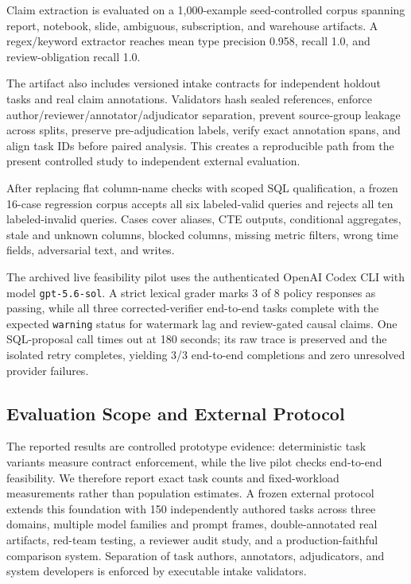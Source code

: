 \documentclass[sigconf,nonacm]{acmart}
\newcommand{\code}[1]{\texttt{#1}}
\begin{document}
Claim extraction is evaluated on a 1{,}000-example seed-controlled corpus spanning report, notebook, slide, ambiguous, subscription, and warehouse artifacts. A regex/keyword extractor reaches mean type precision 0.958, recall 1.0, and review-obligation recall 1.0.

The artifact also includes versioned intake contracts for independent holdout tasks and real claim annotations. Validators hash sealed references, enforce author/reviewer/annotator/adjudicator separation, prevent source-group leakage across splits, preserve pre-adjudication labels, verify exact annotation spans, and align task IDs before paired analysis. This creates a reproducible path from the present controlled study to independent external evaluation.

After replacing flat column-name checks with scoped SQL qualification, a frozen 16-case regression corpus accepts all six labeled-valid queries and rejects all ten labeled-invalid queries. Cases cover aliases, CTE outputs, conditional aggregates, stale and unknown columns, blocked columns, missing metric filters, wrong time fields, adversarial text, and writes.

The archived live feasibility pilot uses the authenticated OpenAI Codex CLI with model \code{gpt-5.6-sol}. A strict lexical grader marks 3 of 8 policy responses as passing, while all three corrected-verifier end-to-end tasks complete with the expected \code{warning} status for watermark lag and review-gated causal claims. One SQL-proposal call times out at 180 seconds; its raw trace is preserved and the isolated retry completes, yielding 3/3 end-to-end completions and zero unresolved provider failures.

\subsection{Evaluation Scope and External Protocol}
The reported results are controlled prototype evidence: deterministic task variants measure contract enforcement, while the live pilot checks end-to-end feasibility. We therefore report exact task counts and fixed-workload measurements rather than population estimates. A frozen external protocol extends this foundation with 150 independently authored tasks across three domains, multiple model families and prompt frames, double-annotated real artifacts, red-team testing, a reviewer audit study, and a production-faithful comparison system. Separation of task authors, annotators, adjudicators, and system developers is enforced by executable intake validators.
\end{document}
